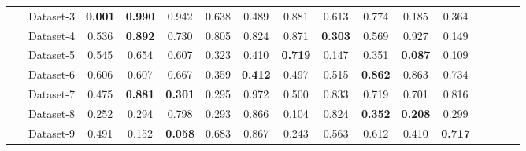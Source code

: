 \begin{table}[!ht]
{\begin{tabular}{ll|cccccccccccccc}
~ & Dataset-3 & \textbf{ 0.001 } & \textbf{ 0.990 } & 0.942 & 0.638 & 0.489 & 0.881 & 0.613 & 0.774 & 0.185 & 0.364\\
~ & Dataset-4 & 0.536 & \textbf{ 0.892 } & 0.730 & 0.805 & 0.824 & 0.871 & \textbf{ 0.303 } & 0.569 & 0.927 & 0.149\\
~ & Dataset-5 & 0.545 & 0.654 & 0.607 & 0.323 & 0.410 & \textbf{ 0.719 } & 0.147 & 0.351 & \textbf{ 0.087 } & 0.109\\
~ & Dataset-6 & 0.606 & 0.607 & 0.667 & 0.359 & \textbf{ 0.412 } & 0.497 & 0.515 & \textbf{ 0.862 } & 0.863 & 0.734\\
~ & Dataset-7 & 0.475 & \textbf{ 0.881 } & \textbf{ 0.301 } & 0.295 & 0.972 & 0.500 & 0.833 & 0.719 & 0.701 & 0.816\\
~ & Dataset-8 & 0.252 & 0.294 & 0.798 & 0.293 & 0.866 & 0.104 & 0.824 & \textbf{ 0.352 } & \textbf{ 0.208 } & 0.299\\
~ & Dataset-9 & 0.491 & 0.152 & \textbf{ 0.058 } & 0.683 & 0.867 & 0.243 & 0.563 & 0.612 & 0.410 & \textbf{ 0.717 }\\

\bottomrule
\end{tabular}
}
\label{tab:my_label}
\end{table}